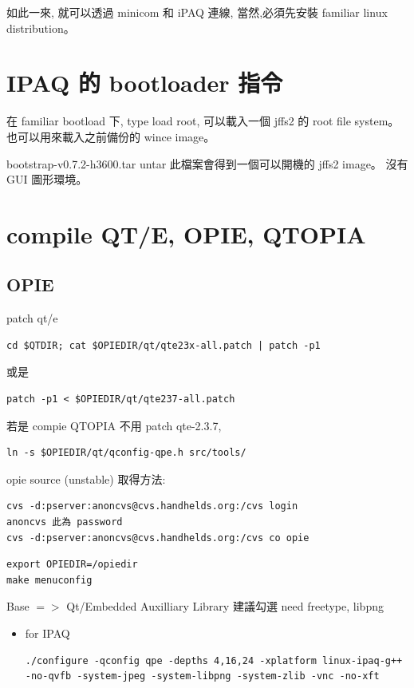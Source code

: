 \documentclass[12pt,a4paper]{article}
\begin{document}
\begin{CJK}{UTF8}{cwmu}
如此一來, 就可以透過 minicom 和 iPAQ 連線,
當然,必須先安裝 familiar linux distribution。

\section{IPAQ 的 bootloader 指令}

在 familiar bootload 下, type
load root,
可以載入一個 jffs2 的 root file system。
也可以用來載入之前備份的 wince image。


bootstrap-v0.7.2-h3600.tar untar 此檔案會得到一個可以開機的 jffs2 image。
沒有 GUI 圖形環境。

\section{compile QT/E, OPIE, QTOPIA}
\subsection{OPIE}
patch qt/e
\begin{verbatim}
cd $QTDIR; cat $OPIEDIR/qt/qte23x-all.patch | patch -p1
\end{verbatim}

或是

\begin{verbatim}
patch -p1 < $OPIEDIR/qt/qte237-all.patch 
\end{verbatim}

若是 compie QTOPIA 不用 patch qte-2.3.7,
\begin{verbatim}
ln -s $OPIEDIR/qt/qconfig-qpe.h src/tools/
\end{verbatim}

opie source (unstable) 取得方法:\\
\begin{verbatim}
cvs -d:pserver:anoncvs@cvs.handhelds.org:/cvs login
anoncvs 此為 password
cvs -d:pserver:anoncvs@cvs.handhelds.org:/cvs co opie
\end{verbatim}

\begin{verbatim}
export OPIEDIR=/opiedir
make menuconfig
\end{verbatim}
Base $=>$ Qt/Embedded Auxilliary Library
建議勾選
need freetype, libpng

\begin{itemize}

\item for IPAQ

\begin{verbatim}
./configure -qconfig qpe -depths 4,16,24 -xplatform linux-ipaq-g++ -no-qvfb -system-jpeg -system-libpng -system-zlib -vnc -no-xft
\end{verbatim}


\end{itemize}
\end{CJK}
\end{document}
